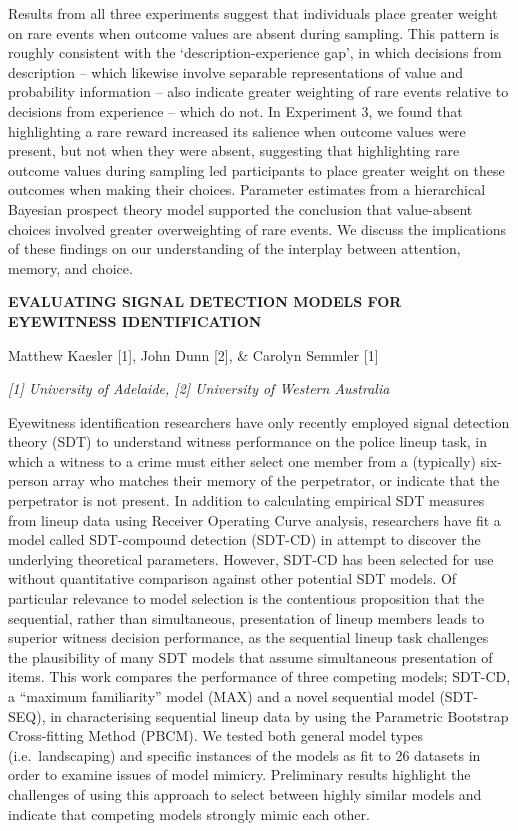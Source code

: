 \documentclass[]{article}
\begin{document}
Results from all three experiments suggest that individuals place
greater weight on rare events when outcome values are absent during
sampling. This pattern is roughly consistent with the
`description-experience gap', in which decisions from description --
which likewise involve separable representations of value and
probability information -- also indicate greater weighting of rare
events relative to decisions from experience -- which do not. In
Experiment 3, we found that highlighting a rare reward increased its
salience when outcome values were present, but not when they were
absent, suggesting that highlighting rare outcome values during sampling
led participants to place greater weight on these outcomes when making
their choices. Parameter estimates from a hierarchical Bayesian prospect
theory model supported the conclusion that value-absent choices involved
greater overweighting of rare events. We discuss the implications of
these findings on our understanding of the interplay between attention,
memory, and choice.

\textbf{EVALUATING SIGNAL DETECTION MODELS FOR EYEWITNESS
IDENTIFICATION}

Matthew Kaesler {[}1{]}, John Dunn {[}2{]}, \& Carolyn Semmler {[}1{]}

\emph{{[}1{]} University of Adelaide, {[}2{]} University of Western
Australia}

Eyewitness identification researchers have only recently employed signal
detection theory (SDT) to understand witness performance on the police
lineup task, in which a witness to a crime must either select one member
from a (typically) six-person array who matches their memory of the
perpetrator, or indicate that the perpetrator is not present. In
addition to calculating empirical SDT measures from lineup data using
Receiver Operating Curve analysis, researchers have fit a model called
SDT-compound detection (SDT-CD) in attempt to discover the underlying
theoretical parameters. However, SDT-CD has been selected for use
without quantitative comparison against other potential SDT models. Of
particular relevance to model selection is the contentious proposition
that the sequential, rather than simultaneous, presentation of lineup
members leads to superior witness decision performance, as the
sequential lineup task challenges the plausibility of many SDT models
that assume simultaneous presentation of items. This work compares the
performance of three competing models; SDT-CD, a ``maximum familiarity''
model (MAX) and a novel sequential model (SDT-SEQ), in characterising
sequential lineup data by using the Parametric Bootstrap Cross-fitting
Method (PBCM). We tested both general model types (i.e.~landscaping) and
specific instances of the models as fit to 26 datasets in order to
examine issues of model mimicry. Preliminary results highlight the
challenges of using this approach to select between highly similar
models and indicate that competing models strongly mimic each other.
\end{document}
